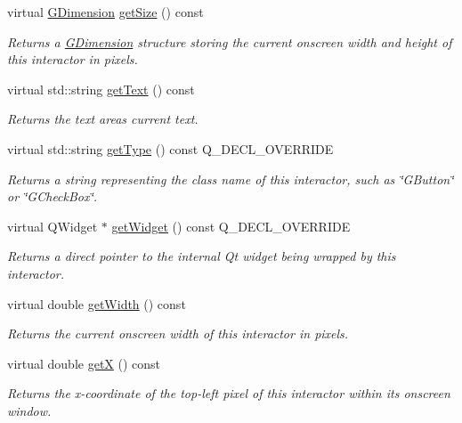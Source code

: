 \begin{DoxyCompactItemize}
virtual \mbox{\hyperlink{classGDimension}{G\+Dimension}} \mbox{\hyperlink{classGInteractor_a7b4eec96a2bdc6420695d5796a78eea9}{get\+Size}} () const
\begin{DoxyCompactList}\small\item\em Returns a \mbox{\hyperlink{classGDimension}{G\+Dimension}} structure storing the current onscreen width and height of this interactor in pixels. \end{DoxyCompactList}\item 
virtual std\+::string \mbox{\hyperlink{classGTextArea_aff553c50924b836c29f146ed34a7c6ec}{get\+Text}} () const
\begin{DoxyCompactList}\small\item\em Returns the text area\textquotesingle{}s current text. \end{DoxyCompactList}\item 
virtual std\+::string \mbox{\hyperlink{classGTextArea_a9896d58fcfebbf1025aeeb5b8b9ede80}{get\+Type}} () const Q\+\_\+\+D\+E\+C\+L\+\_\+\+O\+V\+E\+R\+R\+I\+DE
\begin{DoxyCompactList}\small\item\em Returns a string representing the class name of this interactor, such as \char`\"{}\+G\+Button\char`\"{} or \char`\"{}\+G\+Check\+Box\char`\"{}. \end{DoxyCompactList}\item 
virtual Q\+Widget $\ast$ \mbox{\hyperlink{classGTextArea_a326ee51b5561f807df7b29a1c101f7fd}{get\+Widget}} () const Q\+\_\+\+D\+E\+C\+L\+\_\+\+O\+V\+E\+R\+R\+I\+DE
\begin{DoxyCompactList}\small\item\em Returns a direct pointer to the internal Qt widget being wrapped by this interactor. \end{DoxyCompactList}\item 
virtual double \mbox{\hyperlink{classGInteractor_a0ed2965abd4f5701d2cadf71239faf19}{get\+Width}} () const
\begin{DoxyCompactList}\small\item\em Returns the current onscreen width of this interactor in pixels. \end{DoxyCompactList}\item 
virtual double \mbox{\hyperlink{classGInteractor_a344385751bee0720059403940d57a13e}{getX}} () const
\begin{DoxyCompactList}\small\item\em Returns the x-\/coordinate of the top-\/left pixel of this interactor within its onscreen window. \end{DoxyCompactList}\item 

\end{DoxyCompactItemize}

